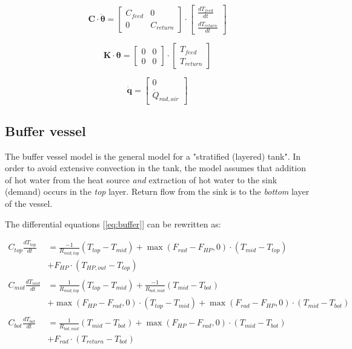 \begin{equation}
	\mathbf{C} \cdot \boldsymbol{\dot{\theta}} =
	\begin{bmatrix}
		C_{feed} & 0 \\
		0 &  C_{return}
	\end{bmatrix}
	\cdot
	\begin{bmatrix}
		\frac{dT_{feed}}{dt} \\
		\frac{dT_{return}}{dt}
	\end{bmatrix}
\end{equation}

\begin{equation}
	\mathbf{K} \cdot \boldsymbol{\theta} =
	\begin{bmatrix}
		0 & 0 \\
		0 &  0
	\end{bmatrix}
	\cdot
	\begin{bmatrix}
		T_{feed} \\
		T_{return}
	\end{bmatrix}
\end{equation}

\begin{equation}
	\mathbf{\dot{q}} =
	\begin{bmatrix}
		0 \\
		\dot{Q}_{rad, air}
	\end{bmatrix}
\end{equation}

\subsection{Buffer vessel}

The buffer vessel model is the general model for a "stratified (layered) tank". In order to avoid extensive convection in the tank, the model assumes that addition of hot water from the heat source \emph{and} extraction of hot water to the sink (demand) occurs in the \emph{top} layer.  Return flow from the sink is to the \emph{bottom} layer of the vessel.

The differential equations [\ref{eq:buffer}] can be rewritten as:

{\color{teal}
	\begin{equation}
		\begin{aligned}
			C_{top}\frac{dT_{top}}{dt} &= \frac{-1}{R_{mid, top}} (T_{top}-T_{mid}) + \max(F_{rad}-F_{HP}, 0) \cdot (T_{mid} - T_{top}) \\
			&+ F_{HP} \cdot (T_{HP,out} - T_{top})
			\\ \\
			C_{mid}\frac{dT_{mid}}{dt} &= \frac{1}{R_{mid, top}} (T_{top}-T_{mid}) + \frac{-1}{R_{bot, mid}}(T_{mid}-T_{bot}) \\
			& + \max(F_{HP}-F_{rad}, 0) \cdot (T_{top} - T_{mid}) + \max(F_{rad}-F_{HP}, 0)  \cdot (T_{mid} - T_{bot}) 
			\\ \\
			C_{bot}\frac{dT_{bot}}{dt} &= \frac{1}{R_{bot, mid}} (T_{mid}-T_{bot}) + \max(F_{HP} - F_{rad}, 0) \cdot (T_{mid} - T_{bot})\\
			& + F_{rad} \cdot (T_{return} - T_{bot}) 
		\end{aligned}
	\end{equation}
}

